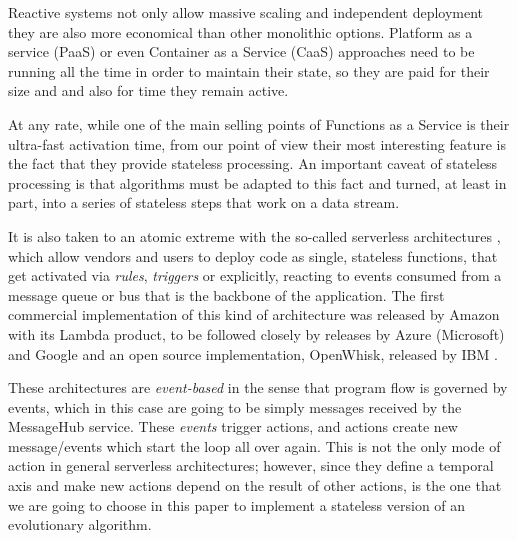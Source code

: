 \documentclass[sigconf]{acmart}
\begin{document}

Reactive systems not only allow massive scaling and independent deployment they
are also more economical than other monolithic options.  Platform as a service
(PaaS) or even Container as a Service (CaaS) approaches need to be running all
the time in order to maintain their state, so they are paid for their size and
and also for time they remain active.

At any rate, while one of the main selling points of Functions as a Service is
their ultra-fast activation time, from our point of view their most interesting
feature is the fact that they provide stateless processing. An important caveat
of stateless processing is that algorithms must be adapted to this fact and
turned, at least in part, into a series of stateless steps that work on a data
stream.


  It is also taken to an atomic extreme
  with the so-called serverless architectures \cite{Varghese2018849},
  which allow vendors and users to deploy code as single, stateless
  functions, that get activated via {\em rules}, {\em triggers} or
  explicitly, reacting to events consumed from
  a message queue or bus that
  is the backbone of the application. The first commercial
  implementation of this kind of architecture was released by Amazon
  with its Lambda product, to be followed closely by releases by Azure
  (Microsoft) and Google and an open source implementation, OpenWhisk,
  released by IBM \cite{Baldini2016287}.

These architectures are {\em event-based} in the sense that program
flow is governed by events, which in this case are going to be simply
messages received by the MessageHub service. These {\em events} trigger actions,
and actions create new message/events which start the loop all over
again. This is not the only mode of action in general serverless
architectures; however, since they define a temporal axis and make new
actions depend on the result of other actions, is the one that we are
going to choose in this paper to implement a stateless version of an
evolutionary algorithm.
\end{document}
